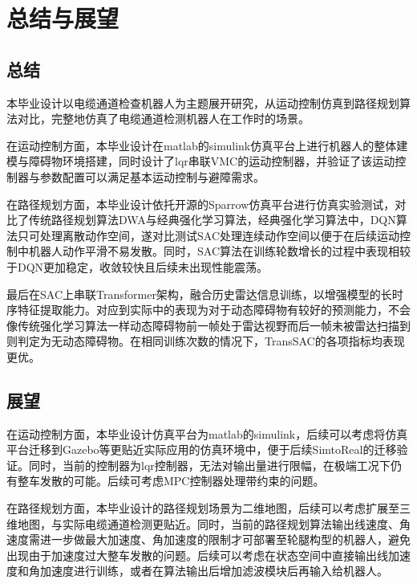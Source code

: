 \chapter{总结与展望}\label{chap:conclusion}

\section{总结}
本毕业设计以电缆通道检查机器人为主题展开研究，从运动控制仿真到路径规划算法对比，完整地仿真了电缆通道检测机器人在工作时的场景。

在运动控制方面，本毕业设计在matlab的simulink仿真平台上进行机器人的整体建模与障碍物环境搭建，同时设计了lqr串联VMC的运动控制器，并验证了该运动控制器与参数配置可以满足基本运动控制与避障需求。

在路径规划方面，本毕业设计依托开源的Sparrow仿真平台进行仿真实验测试，对比了传统路径规划算法DWA与经典强化学习算法，经典强化学习算法中，DQN算法只可处理离散动作空间，遂对比测试SAC处理连续动作空间以便于在后续运动控制中机器人动作平滑不易发散。同时，SAC算法在训练轮数增长的过程中表现相较于DQN更加稳定，收敛较快且后续未出现性能震荡。

最后在SAC上串联Transformer架构，融合历史雷达信息训练，以增强模型的长时序特征提取能力。对应到实际中的表现为对于动态障碍物有较好的预测能力，不会像传统强化学习算法一样动态障碍物前一帧处于雷达视野而后一帧未被雷达扫描到则判定为无动态障碍物。在相同训练次数的情况下，TransSAC的各项指标均表现更优。
\section{展望}
在运动控制方面，本毕业设计仿真平台为matlab的simulink，后续可以考虑将仿真平台迁移到Gazebo等更贴近实际应用的仿真环境中，便于后续SimtoReal的迁移验证。同时，当前的控制器为lqr控制器，无法对输出量进行限幅，在极端工况下仍有整车发散的可能。后续可考虑MPC控制器处理带约束的问题。

在路径规划方面，本毕业设计的路径规划场景为二维地图，后续可以考虑扩展至三维地图，与实际电缆通道检测更贴近。同时，当前的路径规划算法输出线速度、角速度需进一步做最大加速度、角加速度的限制才可部署至轮腿构型的机器人，避免出现由于加速度过大整车发散的问题。后续可以考虑在状态空间中直接输出线加速度和角加速度进行训练，或者在算法输出后增加滤波模块后再输入给机器人。